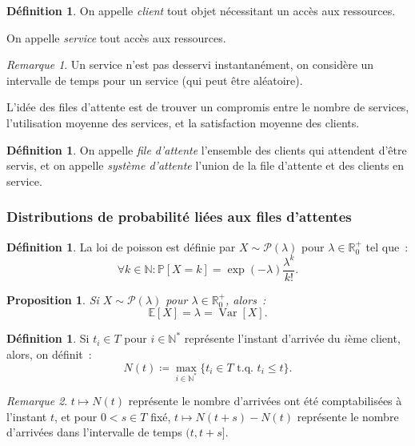 \documentclass{article}
\newtheorem{prp}[thm]{Proposition}
\theoremstyle{definition}
\newtheorem{déf}[thm]{Définition}
\theoremstyle{remark}
\newtheorem*{rmq}{Remarque}
\DeclareMathOperator{\Var}{Var}
\renewcommand{\P}{\mathbb P}
\newcommand{\E}{\mathbb E}
\newcommand{\N}{\mathbb N}
\newcommand{\R}{\mathbb R}
\newcommand{\tq}{\text{ t.q. }}
\begin{document}
	\begin{déf} On appelle \textit{client} tout objet nécessitant un accès aux ressources.

	On appelle \textit{service} tout accès aux ressources.
	\end{déf}

	\begin{rmq} Un service n'est pas desservi instantanément, on considère un intervalle de temps pour un service (qui peut être aléatoire).
	\end{rmq}

	L'idée des files d'attente est de trouver un compromis entre le nombre de services, l'utilisation moyenne des services, et la satisfaction moyenne des
	clients.

	\begin{déf} On appelle \textit{file d'attente} l'ensemble des clients qui attendent d'être servis, et on appelle \textit{système d'attente} l'union de la
	file d'attente et des clients en service.
	\end{déf}

		\subsubsection{Distributions de probabilité liées aux files d'attentes}

	\begin{déf} La loi de poisson est définie par $X \sim \mathcal P(\lambda)$ pour $\lambda \in \R_0^+$ tel que~:
	\[\forall k \in \N : \P[X=k] = \exp(-\lambda)\frac {\lambda^k}{k!}.\]
	\end{déf}

	\begin{prp} Si $X \sim \mathcal P(\lambda)$ pour $\lambda \in \R_0^+$, alors~:
	\[\E[X] = \lambda = \Var[X].\]
	\end{prp}

	\begin{déf} Si $t_i \in T$ pour $i \in \N^*$ représente l'instant d'arrivée du $i$ème client, alors, on définit~:
	\[N(t) \coloneqq \max_{i \in \N^*}\{t_i \in T \tq t_i \leq t\}.\]
	\end{déf}

	\begin{rmq} $t \mapsto N(t)$ représente le nombre d'arrivées ont été comptabilisées à l'instant $t$, et pour $0 < s \in T $ fixé,
	$t \mapsto N(t+s) - N(t)$ représente le nombre d'arrivées dans l'intervalle de temps $(t, t+s]$.
	\end{rmq}
\end{document}
